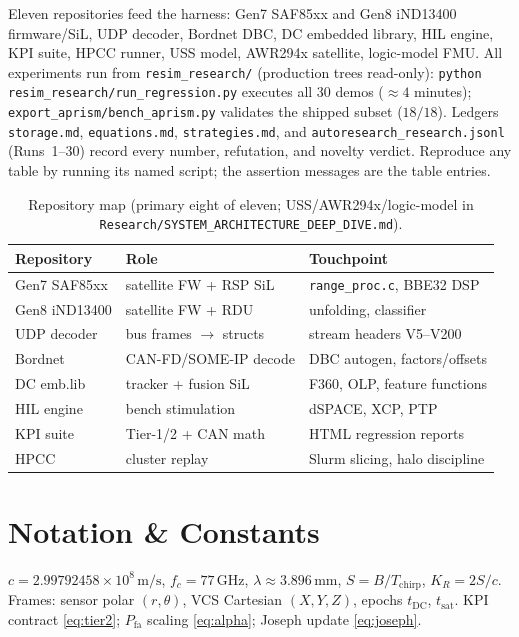 \documentclass[11pt,oneside]{book}
\begin{document}
Eleven repositories feed the harness: Gen7 SAF85xx and Gen8 iND13400
firmware/SiL, UDP decoder, Bordnet DBC, DC embedded library, HIL engine,
KPI suite, HPCC runner, USS model, AWR294x satellite, logic-model FMU.
All experiments run from \texttt{resim\_research/} (production trees
read-only): \texttt{python resim\_research/run\_regression.py} executes all
30 demos ($\approx4$ minutes); \texttt{export\_aprism/bench\_aprism.py}
validates the shipped subset ($18/18$). Ledgers \texttt{storage.md},
\texttt{equations.md}, \texttt{strategies.md}, and
\texttt{autoresearch\_research.jsonl} (Runs~1--30) record every number,
refutation, and novelty verdict. Reproduce any table by running its named
script; the assertion messages are the table entries.

\begin{table}[htbp]
\centering\small
\begin{tabularx}{\linewidth}{@{}llX@{}}
\toprule
Repository & Role & Touchpoint \\
\midrule
Gen7 SAF85xx & satellite FW + RSP SiL & \texttt{range\_proc.c}, BBE32 DSP \\
Gen8 iND13400 & satellite FW + RDU & unfolding, classifier \\
UDP decoder & bus frames $\to$ structs & stream headers V5--V200 \\
Bordnet & CAN-FD/SOME-IP decode & DBC autogen, factors/offsets \\
DC emb.lib & tracker + fusion SiL & F360, OLP, feature functions \\
HIL engine & bench stimulation & dSPACE, XCP, PTP \\
KPI suite & Tier-1/2 + CAN math & HTML regression reports \\
HPCC & cluster replay & Slurm slicing, halo discipline \\
\bottomrule
\end{tabularx}
\caption{Repository map (primary eight of eleven; USS/AWR294x/logic-model
in \texttt{Research/SYSTEM\_ARCHITECTURE\_DEEP\_DIVE.md}).}
\label{tab:repos}
\end{table}

\chapter{Notation \& Constants}
\label{ch:notation}

$c=2.99792458\times10^{8}\,\mathrm{m/s}$, $f_c=77\,\mathrm{GHz}$,
$\lambda\approx3.896\,\mathrm{mm}$, $S=B/T_{\mathrm{chirp}}$,
$K_R=2S/c$. Frames: sensor polar $(r,\theta)$, VCS Cartesian $(X,Y,Z)$,
epochs $t_{\mathrm{DC}}$, $t_{\mathrm{sat}}$. KPI contract \cref{eq:tier2};
$P_{\mathrm{fa}}$ scaling \cref{eq:alpha}; Joseph update \cref{eq:joseph}.
\end{document}
